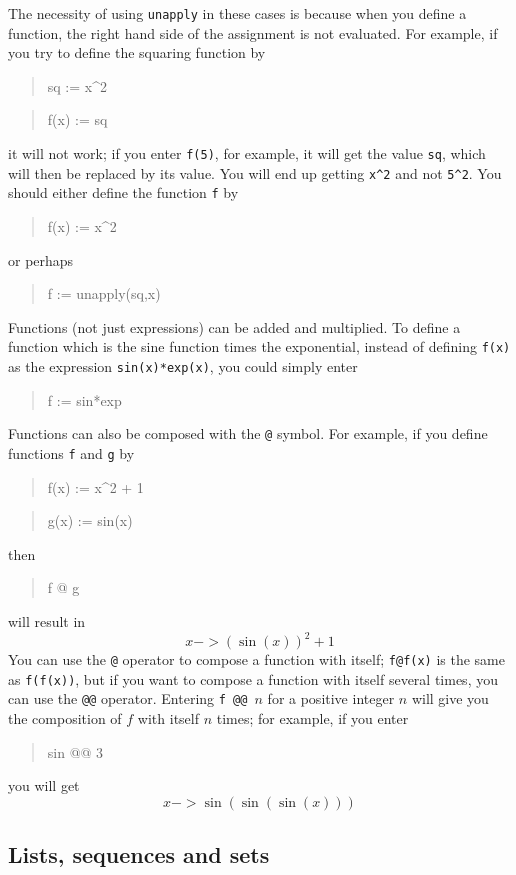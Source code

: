 \documentclass{article}
\newcommand{\xcasin}[1]
{\begin{quote}\ttfamily
#1
\end{quote}}
\newcommand{\xcasout}[1]
{\begin{equation*}
#1
\end{equation*}}
\begin{document}
The necessity of using \texttt{unapply} in these cases is because when
you define a function, the right hand side of the assignment is 
not evaluated.  For example, if you try to define the squaring
function by
\xcasin{sq := x\^{}2}
\xcasin{f(x) := sq}
it will not work; if you enter \texttt{f(5)}, for example, it will
get the value \texttt{sq}, which will then be replaced by its value.
You will end up getting \texttt{x\^{}2} and not \texttt{5\^{}2}.  You
should either define the function \texttt{f} by
\xcasin{f(x) := x\^{}2}
or perhaps
\xcasin{f := unapply(sq,x)}

Functions (not just expressions) can be added and multiplied.  To
define a function which is the sine function times the exponential,
instead of defining \texttt{f(x)} as the expression
\texttt{sin(x)*exp(x)}, you could simply enter
\xcasin{f := sin*exp}
Functions can also be composed with the \texttt{@} symbol.  For example, if
you define functions \texttt{f} and \texttt{g} by
\xcasin{f(x) := x\^{}2 + 1}
\xcasin{g(x) := sin(x)}
then 
\xcasin{f @ g}
will result in
\xcasout{x ->(\sin(x))^2 + 1}
You can use the \texttt{@} operator to compose a function with itself;
\texttt{f@f(x)} is the same as \texttt{f(f(x))}, but if you want to
compose a function with itself several times, you can use the
\texttt{@@} operator.  Entering \texttt{f @@ }$n$ for a positive
integer $n$ will give you the composition of $f$ with itself $n$
times; for example, if you enter
\xcasin{sin @@ 3}
you will get
\xcasout{x -> \sin(\sin(\sin(x)))}


\subsection{Lists, sequences and sets}
\label{lists}
\end{document}
